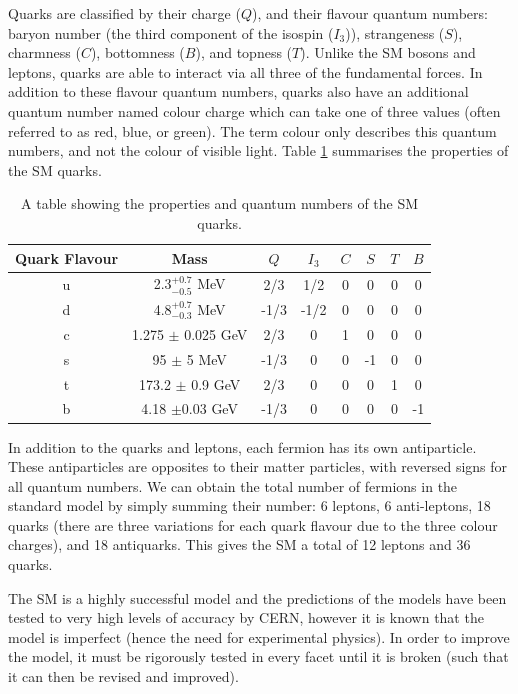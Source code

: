 \documentclass[12pt,a4paper,epsf,portrait,times,epsfig]{report}
\begin{document}
Quarks are classified by their charge ($Q$), and their flavour quantum numbers: baryon number (the third component of the isospin ($I_{3}$)), strangeness ($S$), charmness ($C$), bottomness ($B$), and topness ($T$). Unlike the SM bosons and leptons, quarks are able to interact via all three of the fundamental forces. In addition to these flavour quantum numbers, quarks also have an additional quantum number named colour charge which can take one of three values (often referred to as red, blue, or green). The term colour only describes this quantum numbers, and not the colour of visible light. Table \ref{tab:SMQuarks} summarises the properties of the SM quarks.  


\begin{table}
	\begin{center}
		\begin{tabular}{ |c|c|c|c|c|c|c|c| }
			\hline \hline
			Quark Flavour & Mass & $Q$ & $I_{3}$ & $C$ & $S$ & $T$ & $B$ \\
			\hline
			u & 2.3$_{-0.5}^{+0.7}$ MeV & 2/3 & 1/2 & 0 & 0 & 0 & 0 \\
			\hline
			d & 4.8$_{-0.3}^{+0.7}$ MeV & -1/3 & -1/2 & 0 & 0 & 0 & 0 \\
			\hline
			c & 1.275 $\pm$ 0.025 GeV & 2/3 & 0 & 1 & 0 & 0 & 0 \\
			\hline
			s & 95 $\pm$ 5 MeV & -1/3 & 0 & 0 & -1 & 0 & 0 \\
			\hline
			t & 173.2 $\pm$ 0.9 GeV & 2/3 & 0 & 0 & 0 & 1 & 0 \\
			\hline 
			b & 4.18 $\pm 0.03$ GeV & -1/3 & 0& 0 & 0 & 0 & -1 \\
			\hline \hline
		\end{tabular}
			\caption{A table showing the properties and quantum numbers of the SM quarks\cite{Article:PDG}.}
			\label{tab:SMQuarks}
	\end{center}
\end{table}

In addition to the quarks and leptons, each fermion has its own antiparticle. These antiparticles are opposites to their matter particles, with reversed signs for all quantum numbers. We can obtain the total number of fermions in the standard model by simply summing their number: 6 leptons, 6 anti-leptons, 18 quarks (there are three variations for each quark flavour due to the three colour charges), and 18 antiquarks. This gives the SM a total of 12 leptons and 36 quarks. \par

The SM is a highly successful model and the predictions of the models have been tested to very high levels of accuracy by CERN, however it is known that the model is imperfect (hence the need for experimental physics). In order to improve the model, it must be rigorously tested in every facet until it is broken (such that it can then be revised and improved). \par
\end{document}

